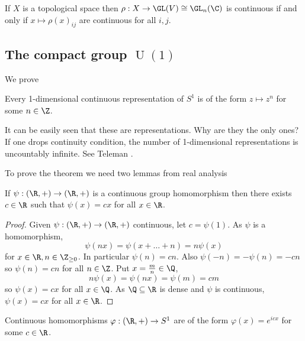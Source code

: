 \documentclass[a4paper]{article}
\theoremstyle{definition}
\begin{document}
\begin{remark}
  If \(X\) is a topological space then \(\rho: X \to \GL(V) \cong \GL_n(\C)\) is continuous if and only if \(x \mapsto \rho(x)_{ij}\) are continuous for all \(i, j\).
\end{remark}

\subsection{The compact group \(\operatorname{U}(1)\)}

We prove
\begin{theorem}
  \label{thm:representation of S1}
  Every 1-dimensional continuous representation of \(S^1\) is of the form \(z \mapsto z^n\) for some \(n \in \Z\).
\end{theorem}

\begin{remark}
  It can be easily seen that these are representations. Why are they the only ones? If one drops continuity condition, the number of 1-dimensional representations is uncountably infinite. See Teleman .
\end{remark}

To prove the theorem we need two lemmas from real analysis
\begin{lemma}
  If \(\psi: (\R, +) \to (\R, +)\) is a continuous group homomorphism then there exists \(c \in \R\) such that \(\psi(x) = cx\) for all \(x \in \R\).
\end{lemma}

\begin{proof}
  Given \(\psi: (\R, +) \to (\R, +)\) continuous, let \(c = \psi(1)\). As \(\psi\) is a homomorphism,
  \[
    \psi(nx) = \psi(x + \dots + n) = n \psi(x)
  \]
  for \(x \in \R, n \in \Z_{\geq 0}\). In particular \(\psi(n) = cn\). Also \(\psi(-n) = - \psi(n) = -cn\) so \(\psi(n) = cn\) for all \(n \in \Z\). Put \(x = \frac{m}{n} \in \Q\),
  \[
    n \psi(x) = \psi(nx) = \psi(m) = cm
  \]
  so \(\psi(x) = cx\) for all \(x \in \Q\). As \(\Q \subseteq \R\) is dense and \(\psi\) is continuous, \(\psi(x) = cx\) for all \(x \in \R\).
\end{proof}

\begin{lemma}
  Continuous homomorphisms \(\varphi: (\R, +) \to S^1\) are of the form \(\varphi(x) = e^{icx}\) for some \(c \in \R\).
\end{lemma}
\end{document}
